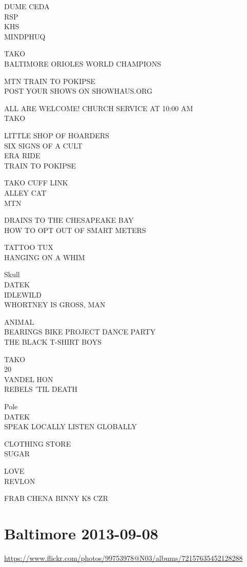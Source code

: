 \documentclass[10pt,letterpaper]{article}
\begin{document}
DUME CEDA\\
RSP\\
KHS\\
MINDPHUQ

TAKO\\
BALTIMORE ORIOLES WORLD CHAMPIONS

MTN TRAIN TO POKIPSE\\
POST YOUR SHOWS ON SHOWHAUS.ORG

ALL ARE WELCOME! CHURCH SERVICE AT 10:00 AM\\
TAKO

LITTLE SHOP OF HOARDERS\\
SIX SIGNS OF A CULT\\
ERA RIDE\\
TRAIN TO POKIPSE

TAKO CUFF LINK\\
ALLEY CAT\\
MTN

DRAINS TO THE CHESAPEAKE BAY\\
HOW TO OPT OUT OF SMART METERS

TATTOO TUX\\
HANGING ON A WHIM

Skull\\
DATEK\\
IDLEWILD\\
WHORTNEY IS GROSS, MAN

ANIMAL\\
BEARINGS BIKE PROJECT DANCE PARTY\\
THE BLACK T{-}SHIRT BOYS

TAKO\\
20\\
VANDEL HON\\
REBELS 'TIL DEATH

Pole\\
DATEK\\
SPEAK LOCALLY LISTEN GLOBALLY

CLOTHING STORE\\
SUGAR

LOVE\\
REVLON

FRAB CHENA BINNY K8 CZR
\

\section*{Baltimore 2013-09-08}

\url{https://www.flickr.com/photos/99753978@N03/albums/72157635452128288}
\end{document}
